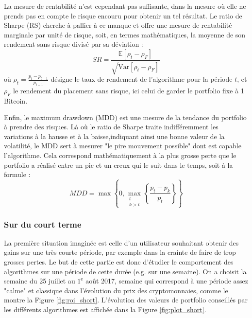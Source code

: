 \documentclass[a4paper, 10pt]{article}
\newcommand{\Var}{\mathrm{Var}}
\begin{document}
La mesure de rentabilité n'est cependant pas suffisante, dans la mesure où elle ne prends pas en compte le risque encouru pour obtenir un tel résultat. Le ratio de Sharpe (RS) \cite{Sharpe1994} cherche à pallier à ce manque et offre une mesure de rentabilité marginale par unité de risque, soit, en termes mathématiques, la moyenne de son rendement sans risque divisé par sa déviation :
\begin{equation}
    SR = \frac{\mathbb{E} \left[ \rho_t - \rho_F \right]}{\sqrt{\Var \left[ \rho_t - \rho_F \right]}}
\end{equation}
où $\rho_t = \frac{p_t - p_{t-1}}{p_{t-1}}$ désigne le taux de rendement de l'algorithme pour la période $t$, et $\rho_F$ le rendement du placement sans risque, ici celui de garder le portfolio fixe à 1 Bitcoin.

Enfin, le maximum drawdown (MDD) \cite{Magdon2004} est une mesure de la tendance du portfolio à prendre des risques. Là où le ratio de Sharpe traite indifféremment les variations à la hausse et à la baisse,indiquant ainsi une bonne valeur de la volatilité, le MDD sert à mesurer "le pire mouvement possible" dont est capable l'algorithme. Cela correspond mathématiquement à la plus grosse perte que le portfolio a réalisé entre un pic et un creux qui le suit dans le temps, soit à la formule : 
\begin{equation}
    MDD = \max \left \{ 0, \max\limits_{\substack{t \\ k > t}} \left \{ \frac{p_t - p_k}{p_t} \right \} \right \}
\end{equation}

\subsubsection{Sur du court terme}
\label{sec:theorie_empiriqu_court}

La première situation imaginée est celle d'un utilisateur souhaitant obtenir des gains sur une très courte période, par exemple dans la crainte de faire de trop grosses pertes. Le but de cette partie est donc d'étudier le comportement des algorithmes sur une période de cette durée (e.g. sur une semaine). On a choisit la semaine du 25 juillet au $1^{\text{e}}$ août 2017, semaine qui correspond à une période assez "calme" et classique dans l'évolution du prix des cryptomonnaies, comme le montre la Figure \ref{fig:roi_short}. L'évolution des valeurs de portfolio conseillés par les différents algorithmes est affichée dans la Figure \ref{fig:plot_short}.
\end{document}
